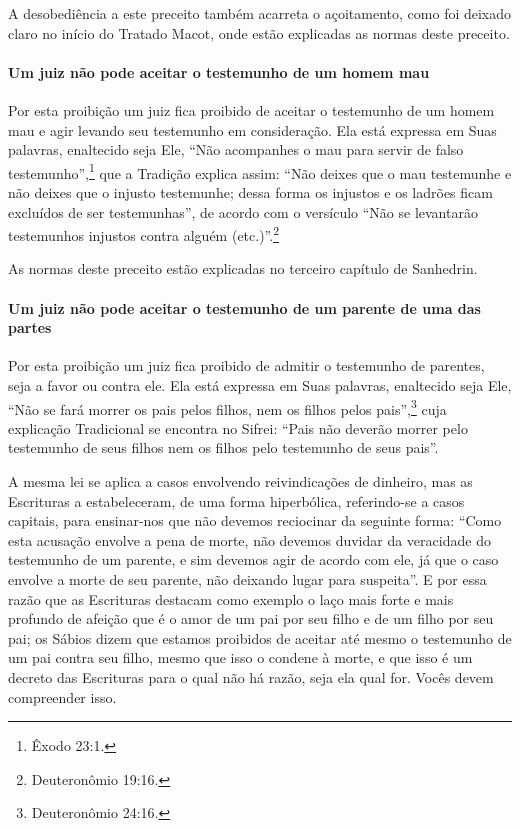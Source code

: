 A desobediência a este preceito também acarreta o açoitamento, como foi
deixado claro no início do Tratado Macot, onde estão explicadas as
normas deste preceito.

\paragraph{Um juiz não pode aceitar o testemunho de um homem mau}

Por esta proibição um juiz fica proibido de aceitar o testemunho de um
homem mau e agir levando seu testemunho em consideração. Ela está
expressa em Suas palavras, enaltecido seja Ele, ``Não acompanhes o mau
para servir de falso testemunho'',\footnote{Êxodo 23:1.} que a Tradição explica
assim: ``Não deixes que o mau testemunhe e não deixes que o injusto
testemunhe; dessa forma os injustos e os ladrões ficam excluídos de ser
testemunhas'', de acordo com o versículo ``Não se levantarão testemunhos
injustos contra alguém (etc.)''.\footnote{Deuteronômio 19:16.}

As normas deste preceito estão explicadas no terceiro capítulo de Sanhedrin.

\paragraph{Um juiz não pode aceitar o testemunho de um parente de uma das partes}

Por esta proibição um juiz fica proibido de admitir o testemunho de
parentes, seja a favor ou contra ele. Ela está expressa em Suas
palavras, enaltecido seja Ele, ``Não se fará morrer os pais pelos
filhos, nem os filhos pelos pais'',\footnote{Deuteronômio 24:16.} cuja explicação
Tradicional se encontra no Sifrei: ``Pais não deverão morrer pelo
testemunho de seus filhos nem os filhos pelo testemunho de seus pais''.

A mesma lei se aplica a casos envolvendo reivindicações de dinheiro,
mas as Escrituras a estabeleceram, de uma forma hiperbólica,
referindo-se a casos capitais, para ensinar-nos que não devemos
reciocinar da seguinte forma: ``Como esta acusação envolve a pena de
morte, não devemos duvidar da veracidade do testemunho de um parente, e
sim devemos agir de acordo com ele, já que o caso envolve a morte de seu
parente, não deixando lugar para suspeita''. E por essa razão que as
Escrituras destacam como exemplo o laço mais forte e mais profundo de
afeição que é o amor de um pai por seu filho e de um filho por seu pai;
os Sábios dizem que estamos proibidos de aceitar até mesmo o testemunho
de um pai contra seu filho, mesmo que isso o condene à morte, e que isso
é um decreto das Escrituras para o qual não há razão, seja ela qual for.
Vocês devem compreender isso.

